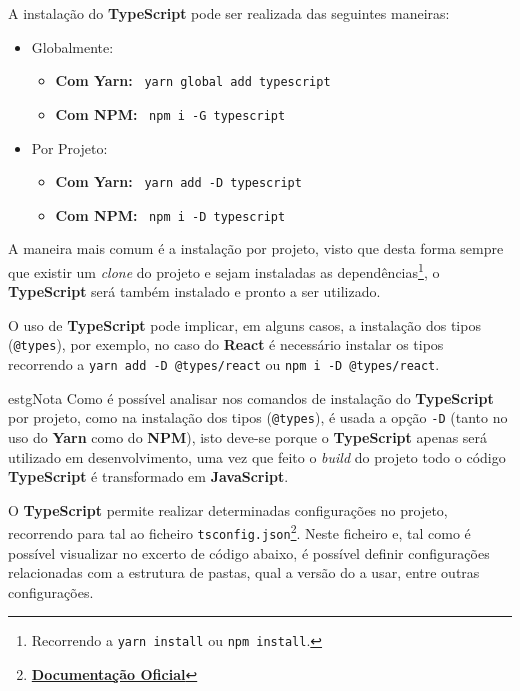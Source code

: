 \label{typescriptAttachment}


A instalação do \textbf{TypeScript} pode ser realizada das seguintes maneiras:

\begin{itemize}
	\item Globalmente:
	\begin{itemize}
		\item \textbf{Com Yarn:} ~\texttt{yarn global add typescript}
		\item \textbf{Com NPM:} ~\texttt{npm i -G typescript}
	\end{itemize}
	\item Por Projeto:
	\begin{itemize}
		\item \textbf{Com Yarn:} ~\texttt{yarn add -D typescript}
		\item \textbf{Com NPM:} ~\texttt{npm i -D typescript}
	\end{itemize}
\end{itemize}

A maneira mais comum é a instalação por projeto, visto que desta forma sempre que existir um \textit{clone} do projeto e sejam instaladas as dependências\footnote{Recorrendo a \texttt{yarn install} ou \texttt{npm install}.}, o \textbf{TypeScript} será também instalado e pronto a ser utilizado.

O uso de \textbf{TypeScript} pode implicar, em alguns casos, a instalação dos tipos (\texttt{@types}), por exemplo, no caso do \textbf{React} é necessário instalar os tipos recorrendo a \texttt{yarn add -D @types/react} ou \texttt{npm i -D @types/react}.

\begin{mybox}{estg}{Nota}
	Como é possível analisar nos comandos de instalação do \textbf{TypeScript} por projeto, como na instalação dos tipos (\texttt{@types}), é usada a opção \texttt{-D} (tanto no uso do \textbf{Yarn} como do \textbf{NPM}), isto deve-se porque o \textbf{TypeScript} apenas será utilizado em desenvolvimento, uma vez que feito o \textit{build} do projeto todo o código \textbf{TypeScript} é transformado em \textbf{JavaScript}.
\end{mybox}


O \textbf{TypeScript} permite realizar determinadas configurações no projeto, recorrendo para tal ao ficheiro \texttt{tsconfig.json}\footnote{\textbf{\href{https://www.typescriptlang.org/tsconfig}{Documentação Oficial}}}. Neste ficheiro e, tal como é possível visualizar no excerto de código abaixo, é possível definir configurações relacionadas com a estrutura de pastas, qual a versão do  a usar, entre outras configurações.

